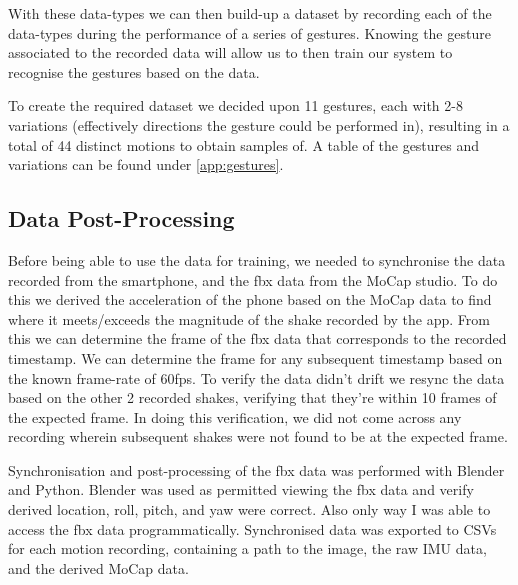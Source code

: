 With these data-types we can then build-up a dataset by recording each of the data-types during the performance of a series of gestures. Knowing the gesture associated to the recorded data will allow us to then train our system to recognise the gestures based on the data.

To create the required dataset we decided upon 11 gestures, each with 2-8 variations (effectively directions the gesture could be performed in), resulting in a total of 44 distinct motions to obtain samples of. A table of the gestures and variations can be found under \autoref{app:gestures}.



\subsection{Data Post-Processing}
Before being able to use the data for training, we needed to synchronise the data recorded from the smartphone, and the fbx data from the MoCap studio.
To do this we derived the acceleration of the phone based on the MoCap data to find where it meets/exceeds the magnitude of the shake recorded by the app. From this we can determine the frame of the fbx data that corresponds to the recorded timestamp. We can determine the frame for any subsequent timestamp based on the known frame-rate of 60fps. 
To verify the data didn't drift we resync the data based on the other 2 recorded shakes, verifying that they're within 10 frames of the expected frame. In doing this verification, we did not come across any recording wherein subsequent shakes were not found to be at the expected frame.

Synchronisation and post-processing of the fbx data was performed with Blender and Python.
Blender was used as permitted viewing the fbx data and verify derived location, roll, pitch, and yaw were correct. Also only way I was able to access the fbx data programmatically.
Synchronised data was exported to CSVs for each motion recording, containing a path to the image, the raw IMU data, and the derived MoCap data.



